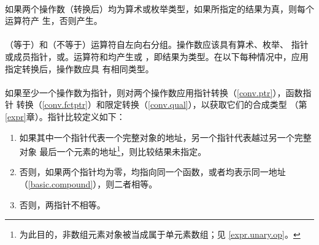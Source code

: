 \paragraph{}
如果两个操作数（转换后）均为算术或枚举类型，如果所指定的结果为真，则每个运算符产
生，否则产生。


\paragraph{}
\tm{==}（等于）和\tm{!=}（不等于）运算符自左向右分组。操作数应该具有算术、枚举、
指针或成员指针，或。运算符\tm{==}和\tm{!=}均产生或
，即结果为类型。在以下每种情况中，应用指定转换后，操作数应具
有相同类型。

\paragraph{}
如果至少一个操作数为指针，则对两个操作数应用指针转换（\ref{conv.ptr}），函数指针
转换（\ref{conv.fctptr}）和限定转换（\ref{conv.qual}），以获取它们的合成类型
（第\ref{expr}章）。指针比较定义如下：
\begin{enumerate}
  \item{如果其中一个指针代表一个完整对象的地址，另一个指针代表越过另一个完整对象
    最后一个元素的地址\footnote{为此目的，非数组元素对象被当成属于单元素数组；见
    \ref{expr.unary.op}。}，则比较结果未指定。}
  \item{否则，如果两个指针均为零，均指向同一个函数，或者均表示同一地址
    （\ref{basic.compound}），则二者相等。}
  \item{否则，两指针不相等。}
\end{enumerate}

